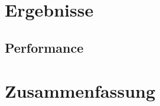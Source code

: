 \documentclass[course=erap]{aspdoc}
\begin{document}
\section{Ergebnisse}



\subsection{Performance}

\section{Zusammenfassung}

\printbibliography
\end{document}
